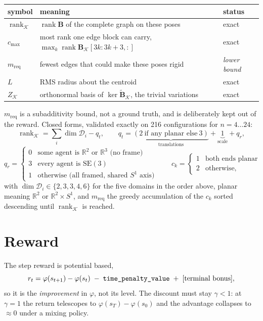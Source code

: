 \documentclass[11pt,a4paper]{article}
\newcommand{\R}{\mathbb{R}}
\newcommand{\SEthree}{\mathrm{SE}(3)}
\newcommand{\rk}{\operatorname{rank}}
\newcommand{\B}{\mathbf{B}}
\newcommand{\Bs}{\widetilde{\mathbf{B}}}
\begin{document}
\begin{center}
\begin{tabular}{lll}
\toprule
symbol & meaning & status \\
\midrule
$\rk_{\mathcal K}$ & $\rk \B$ of the complete graph on these poses & exact \\
$c_{\max}$ & most rank one edge block can carry, $\max_k \rk \B_{\mathcal K}[3k{:}3k{+}3,:]$ & exact \\
$m_{\text{req}}$ & fewest edges that could make these poses rigid & \emph{lower bound} \\
$L$ & RMS radius about the centroid & exact \\
$Z_{\mathcal K}$ & orthonormal basis of $\ker\Bs_{\mathcal K}$, the trivial variations & exact \\
\bottomrule
\end{tabular}
\end{center}

\noindent
$m_{\text{req}}$ is a subadditivity bound, not a ground truth, and is deliberately kept out
of the reward. Closed forms, validated exactly on 216 configurations for $n=4\ldots24$:
\[
\rk_{\mathcal K}=\sum_i \dim\mathcal D_i-q_t,
\qquad
q_t=\underbrace{(2\ \text{if any planar else}\ 3)}_{\text{translations}}+\underbrace{1}_{\text{scale}}+q_r,
\]
\[
q_r=\begin{cases}
0 & \text{some agent is } \R^2 \text{ or } \R^3 \text{ (no frame)}\\
3 & \text{every agent is } \SEthree\\
1 & \text{otherwise (all framed, shared } S^1 \text{ axis)}
\end{cases}
\qquad
c_k=\begin{cases}1 & \text{both ends planar}\\ 2 & \text{otherwise,}\end{cases}
\]
with $\dim\mathcal D_i \in \{2,3,3,4,6\}$ for the five domains in the order above, planar
meaning $\R^2$ or $\R^2\!\times\!S^1$, and $m_{\text{req}}$ the greedy accumulation of the
$c_k$ sorted descending until $\rk_{\mathcal K}$ is reached.

\section{Reward}

The step reward is potential based,
\[
r_t=\varphi(s_{t+1})-\varphi(s_t)\;-\;\text{\texttt{time\_penalty\_value}}\;+\;[\text{terminal bonus}],
\]
so it is the \emph{improvement} in $\varphi$, not its level. The discount must stay
$\gamma<1$: at $\gamma=1$ the return telescopes to $\varphi(s_T)-\varphi(s_0)$ and the
advantage collapses to $\approx 0$ under a mixing policy.
\end{document}
